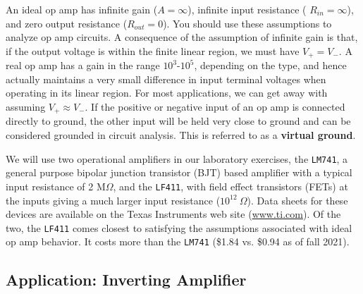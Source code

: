 \documentclass[11pt]{article}
\begin{document}
An ideal op amp has infinite gain ($A = \infty$), infinite input
resistance ( $R_{in} = \infty$), and zero output resistance
($R_{out} = 0$). You should use these assumptions to analyze op amp
circuits. A consequence of the assumption of infinite gain is that, if
the output voltage is within the finite linear region, we must have
$V_+ = V_-$. A real op amp has a gain in the range $10^3$-$10^5$,
depending on the type, and hence actually maintains a very small
difference in input terminal voltages when operating in its linear
region. For most applications, we can get away with assuming
$V_+ \approx V_-$. If the positive or negative input of an op amp is
connected directly to ground, the other input will be held very close
to ground and can be considered grounded in circuit analysis. This is
referred to as a \textbf{virtual ground}.

\vspace{12 pt}
\noindent
{}
\vspace{12 pt}

We will use two operational amplifiers in our laboratory exercises,
the \texttt{LM741}, a general purpose bipolar junction transistor
(BJT) based amplifier with a typical input resistance of 2 M$\Omega $,
and the \texttt{LF411}, with field effect transistors (FETs) at the
inputs giving a much larger input resistance ($10^{12}~\Omega$).
Data sheets for these devices are available on the Texas Instruments
web site (\url{www.ti.com}). Of the two, the \texttt{LF411} comes
closest to satisfying the assumptions associated with ideal op amp
behavior. It costs more than the \texttt{LM741} (\$1.84 vs. \$0.94 as
of fall 2021).

\subsection{Application: Inverting Amplifier}
\label{sec:invertingamp}
\end{document}

